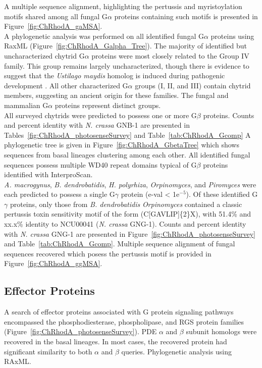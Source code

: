\indent A multiple sequence alignment, highlighting the pertussis and myristoylation motifs shared among all fungal G$\alpha$ proteins containing such motifs is presented in Figure~\ref{fig:ChRhodA_gaMSA}.\\
\indent A phylogenetic analysis was performed on all identified fungal G$\alpha$ proteins using RaxML (Figure~\ref{fig:ChRhodA_Galpha_Tree}). The majority of identified but uncharacterized chytrid G$\alpha$ proteins were most closely related to the Group IV family. This group remains largely uncharacterized, though there is evidence to suggest that the \textit{Ustilago maydis} homolog is induced during pathogenic development \cite{Bolker1998}. All other characterized G$\alpha$ groups (I, II, and III) contain chytrid members, suggesting an ancient origin for these families. The fungal and mammalian G$\alpha$ proteins represent distinct groups.\\

\indent All surveyed chytrids were predicted to possess one or more G$\beta$ proteins. Counts and percent identity with \textit{N. crassa} GNB-1 are presented in Tables~\ref{fig:ChRhodA_photosenseSurvey} and Table~\ref{tab:ChRhodA_Gcomp} A phylogenetic
tree is given in Figure~\ref{fig:ChRhodA_GbetaTree} which shows sequences from basal lineages
clustering among each other. All identified fungal sequences possess multiple WD40 repeat domains
typical of G$\beta$ proteins identified with InterproScan. \\

\indent \textit{A. macrogynus}, \textit{B. dendrobatidis}, \textit{H. polyrhiza}, \textit{Orpinomyces}, and \textit{Piromyces} were each predicted to possess a single G$\gamma$ protein (e-val < 1e$^{-5}$). Of these identified G$\gamma$ proteins, only those from \textit{B. dendrobatidis} \textit{Orpinomyces} contained a classic pertussis toxin sensitivity motif of the form (C[GAVLIP]\{2\}X), with 51.4\% and xx.x\% identity to NCU00041 (\textit{N. crassa} GNG-1). Counts and percent identity with \textit{N. crassa} GNG-1 are presented in Figure~\ref{fig:ChRhodA_photosenseSurvey} and Table~\ref{tab:ChRhodA_Gcomp}. Multiple sequence alignment of fungal sequences recovered which posess the pertussis motif is provided in Figure~\ref{fig:ChRhodA_ggMSA}.\\

\subsection*{Effector Proteins}
A search of effector proteins associated with G protein signaling pathways encompassed the phosphodiesterase, phospholipase, and RGS protein families (Figure~\ref{fig:ChRhodA_photosenseSurvey}). PDE $\alpha$ and $\beta$ subunit homologs were recovered in the basal lineages. In most cases, the recovered protein had significant similarity to both $\alpha$ and $\beta$ queries. Phylogenetic analysis using RAxML.\\ 

